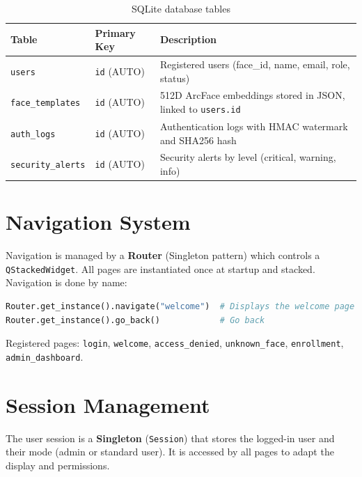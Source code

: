 \begin{table}[H]
    \centering
    \begin{tabularx}{\textwidth}{llX}
        \toprule
        \textbf{Table} & \textbf{Primary Key} & \textbf{Description} \\
        \midrule
        \texttt{users}            & \texttt{id} (AUTO)  & Registered users (face\_id, name, email, role, status) \\
        \texttt{face\_templates}  & \texttt{id} (AUTO)  & 512D ArcFace embeddings stored in JSON, linked to \texttt{users.id} \\
        \texttt{auth\_logs}       & \texttt{id} (AUTO)  & Authentication logs with HMAC watermark and SHA256 hash \\
        \texttt{security\_alerts} & \texttt{id} (AUTO)  & Security alerts by level (critical, warning, info) \\
        \bottomrule
    \end{tabularx}
    \caption{SQLite database tables}
\end{table}


\section{Navigation System}

Navigation is managed by a \textbf{Router} (Singleton pattern) which controls a \texttt{QStackedWidget}. All pages are instantiated once at startup and stacked. Navigation is done by name:

\begin{lstlisting}[language=Python, caption={Navigation example}]
Router.get_instance().navigate("welcome")  # Displays the welcome page
Router.get_instance().go_back()            # Go back
\end{lstlisting}

Registered pages: \texttt{login}, \texttt{welcome}, \texttt{access\_denied}, \texttt{unknown\_face}, \texttt{enrollment}, \texttt{admin\_dashboard}.

\section{Session Management}

The user session is a \textbf{Singleton} (\texttt{Session}) that stores the logged-in user and their mode (admin or standard user). It is accessed by all pages to adapt the display and permissions.

